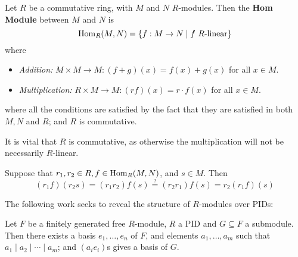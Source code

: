\begin{definition}
    Let $R$ be a commutative ring, with $M$ and $N$ $R$-modules. Then the \textbf{Hom Module} between $M$ and $N$ is
    \[
        \Hom_R(M, N) = \{ f: M\to N \mid f \ R\text{-linear} \}
    \]
    where 
    \begin{itemize}
        \item \emph{Addition:} $M \times M \to M: (f + g)(x) = f(x) + g(x)$ for all $x\in M$.
        \item \emph{Multiplication:} $R \times M \to M: (rf)(x) = r\cdot f(x)$ for all $x\in M$.
    \end{itemize}
    where all the conditions are satisfied by the fact that they are satisfied in both $M, N$ and $R$; and $R$ is commutative. 
\end{definition}

\begin{remark}
    It is vital that $R$ is commutative, as otherwise the multiplication will not be necessarily $R$-linear.

    Suppose that $r_1, r_2 \in R, f\in \mathrm{Hom}_R(M, N)$, and $s\in M$. Then 
    \[
        (r_1f)(r_2 s) = (r_1 r_2) f(s) \overset{?}{=} (r_2 r_1) f(s) = r_2 (r_1 f) (s)
    \]
\end{remark}
    
The following work seeks to reveal the structure of $R$-modules over PIDs:

\begin{theorem}\label{thm:Main Structural PID}
    Let $F$ be a finitely generated free $R$-module, $R$ a PID and $G \subseteq F$ a submodule. Then there exists a basis $e_1, \ldots, e_n$ of $F$, and elements $a_1, \ldots, a_m$ such that $a_1\mid a_2\mid\cdots\mid a_m$; and $(a_ie_i)$s gives a basis of $G$. 
\end{theorem}

